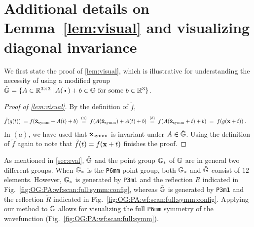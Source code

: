 
\section{Additional details on Lemma~\ref{lem:visual} and visualizing diagonal invariance } \label{appendix:diag:inv:illustration}

\noindent
We first state the proof of \cref{lem:visual}, which is illustrative for understanding the necessity of using a modified group $\tilde \G = \{ A \in \R^{3 \times 3} \,|\, A(\argdot) + b \in \G \text{ for some } b \in \R^3 \}$. 

\begin{proof}[Proof of \cref{lem:visual}] By the definition of $\tilde f$,
\begin{align*}
    \tilde f( g(t) )
    \;=&\;
    f( \tilde {\mathbf{x}}_{\rm symm} + A(t) + b )
    \;\overset{(a)}{=}\;
    f( A(\tilde {\mathbf{x}}_{\rm symm}) + A(t) + b )
    \;\overset{(b)}{=}\;
    f( A(\tilde {\mathbf{x}}_{\rm symm} + t ) + b) \;=\; f(g(\mathbf{x}+t))\;.
\end{align*}
In $(a)$, we have used that $\tilde {\mathbf{x}}_{\rm symm}$ is invariant under $A \in \tilde {\mathbb{G}}$. Using the definition of $\tilde f$ again to note that $\tilde f(t) =f(\mathbf{x} + t)$ finishes the proof.
\end{proof}

As mentioned in \cref{sec:eval}, $\tilde {\mathbb{G}}$ and the point group $\mathbb{G}_*$ of $\mathbb{G}$ are in general two different groups. When $\mathbb{G}_*$ is the \texttt{P6mm} point group, both $\mathbb{G}_*$ and $\tilde {\mathbb{G}}$ consist of $12$ elements.  However, $\mathbb{G}_*$ is generated by \texttt{P3m1} and the reflection $R$ indicated in Fig.~\ref{fig:OG:PA:wf:scan:full:symm:config}, whereas $\tilde {\mathbb{G}}$ is generated by \texttt{P3m1} and the reflection $\tilde R$ indicated in Fig.~\ref{fig:OG:PA:wf:scan:full:symm:config}. Applying our method to $\tilde {\mathbb{G}}$ allows for visualizing the full \texttt{P6mm} symmetry of the wavefunction (Fig.~\ref{fig:OG:PA:wf:scan:full:symm}).

